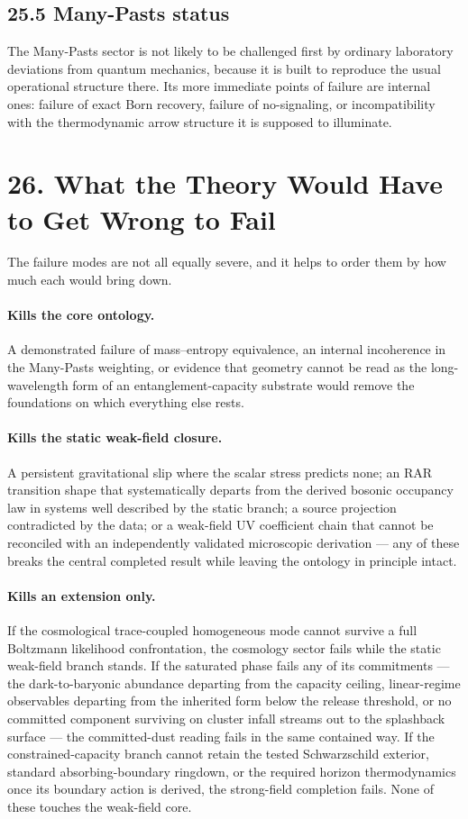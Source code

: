 \documentclass[11pt]{article}
\begin{document}
\subsection{25.5 Many-Pasts status}

The Many-Pasts sector is not likely to be challenged first by ordinary laboratory deviations from quantum mechanics, because it is built to reproduce the usual operational structure there. Its more immediate points of failure are internal ones: failure of exact Born recovery, failure of no-signaling, or incompatibility with the thermodynamic arrow structure it is supposed to illuminate.
\section{26. What the Theory Would Have to Get Wrong to Fail}

The failure modes are not all equally severe, and it helps to order them by how much each would bring down.

\paragraph{Kills the core ontology.} A demonstrated failure of mass--entropy equivalence, an internal incoherence in the Many-Pasts weighting, or evidence that geometry cannot be read as the long-wavelength form of an entanglement-capacity substrate would remove the foundations on which everything else rests.

\paragraph{Kills the static weak-field closure.} A persistent gravitational slip where the scalar stress predicts none; an RAR transition shape that systematically departs from the derived bosonic occupancy law in systems well described by the static branch; a source projection contradicted by the data; or a weak-field UV coefficient chain that cannot be reconciled with an independently validated microscopic derivation --- any of these breaks the central completed result while leaving the ontology in principle intact.

\paragraph{Kills an extension only.} If the cosmological trace-coupled homogeneous mode cannot survive a full Boltzmann likelihood confrontation, the cosmology sector fails while the static weak-field branch stands. If the saturated phase fails any of its commitments --- the dark-to-baryonic abundance departing from the capacity ceiling, linear-regime observables departing from the inherited form below the release threshold, or no committed component surviving on cluster infall streams out to the splashback surface --- the committed-dust reading fails in the same contained way. If the constrained-capacity branch cannot retain the tested Schwarzschild exterior, standard absorbing-boundary ringdown, or the required horizon thermodynamics once its boundary action is derived, the strong-field completion fails. None of these touches the weak-field core.
\end{document}
